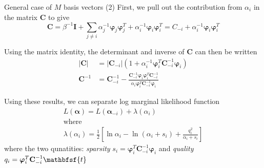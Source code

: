 \documentclass{bredelebeamer}
\begin{document}
\begin{frame}{General case of $M$ basis vectors (2)}
  First, we pull out the contribution from $\alpha_i$ in the matrix $\mathbf{C}$ to give
  \begin{equation}
    \mathbf{C}
    = \beta^{-1} \mathbf{I}
    + \sum_{j \neq i} \alpha_j^{-1} \boldsymbol{\varphi}_j \boldsymbol{\varphi}_j^T
    + \alpha_i^{-1} \boldsymbol{\varphi}_i \boldsymbol{\varphi}_i^T
    = C_{-i} + \alpha_i^{-1} \boldsymbol{\varphi}_i \boldsymbol{\varphi}_i^T
  \end{equation}

  Using the matrix identity, the determinant and inverse of $\mathbf{C}$ can then
  be written
  \begin{equation}
    \begin{split}
      |\mathbf{C}|
      &= |\mathbf{C}_{-i}|
      (1 + \alpha_i^{-1} \boldsymbol{\varphi}_i^T \mathbf{C}_{-i}^{-1} \boldsymbol{\varphi}_i ) \\
      \mathbf{C}^{-1}
      &= \mathbf{C}_{-i}^{-1}
      - \frac{\mathbf{C}_{-i}^{-1} \boldsymbol{\varphi}_i \boldsymbol{\varphi}_i^T \mathbf{C}_{-i}^{-1} }{\alpha_i \boldsymbol{\varphi}_i^T \mathbf{C}_{-i}^{-1} \boldsymbol{\varphi}_i}
    \end{split}
  \end{equation}

  Using these results, we can separate log marginal likelihood function
  \begin{equation}
    \begin{gathered}
      L(\boldsymbol{\alpha}) = L(\boldsymbol{\alpha}_{-i}) + \lambda (\alpha_i) \\
      \textrm{where} \\
      \lambda (\alpha_i) = \frac{1}{2}
      \left[
        \ln \alpha_i - \ln(\alpha_i + s_i) + \frac{q_i^2}{\alpha_i + s_i}
      \right]
    \end{gathered}
  \end{equation}
  where the two qunatities:
  \textit{sparsity} $s_i = \boldsymbol{\varphi}_i^T \mathbf{C}_{-i}^{-1} \boldsymbol{\varphi}_i$
  and \textit{quality} $q_i = \boldsymbol{\varphi}_i^T \mathbf{C}_{-i}^{-1} \mathbfsf{t}$
\end{frame}
\end{document}
